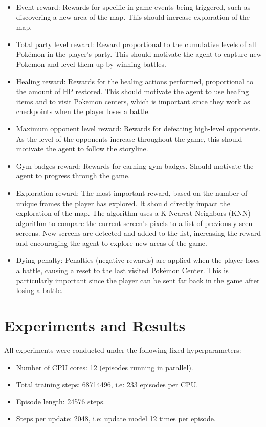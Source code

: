 \documentclass[10pt,conference]{IEEEtran}
\begin{document}
\begin{itemize}
  \item Event reward: Rewards for specific in-game events being triggered, such as discovering a new area of the map. This should increase exploration of the map.
  \item Total party level reward: Reward proportional to the cumulative levels of all Pokémon in the player's party. This should motivate the agent to capture new Pokemon and level them up by winning battles.
  \item Healing reward: Rewards for the healing actions performed, proportional to the amount of HP restored. This should motivate the agent to use healing items and to visit Pokemon centers, which is important since they work as checkpoints when the player loses a battle.
  \item Maximum opponent level reward: Rewards for defeating high-level opponents. As the level of the opponents increase throughout the game, this should motivate the agent to follow the storyline.
  \item Gym badges reward: Rewards for earning gym badges. Should motivate the agent to progress through the game.
  \item Exploration reward: The most important reward, based on the number of unique frames the player has explored. It should directly impact the exploration of the map. The algorithm uses a K-Nearest Neighbors (KNN) algorithm to compare the current screen's pixels to a list of previously seen screens. New screens are detected and added to the list, increasing the reward and encouraging the agent to explore new areas of the game.
  \item Dying penalty: Penalties (negative rewards) are applied when the player loses a battle, causing a reset to the last visited Pokémon Center. This is particularly important since the player can be sent far back in the game after losing a battle.
\end{itemize}



\newpage



\section{Experiments and Results}

All experiments were conducted under the following fixed hyperparameters:

\begin{itemize}
  \item Number of CPU cores: 12 (episodes running in parallel).
  \item Total training steps: 68714496, i.e: 233 episodes per CPU.
  \item Episode length: 24576 steps.
  \item Steps per update: 2048, i.e: update model 12 times per episode.
\end{itemize}
\end{document}
